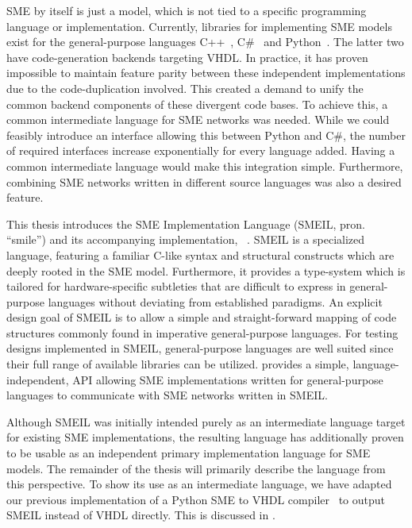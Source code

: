 SME by itself is just a model, which is not tied to a specific programming
language or implementation. Currently, libraries for implementing SME models
exist for the general-purpose languages C++~\cite{asheim2015},
C\#~\cite{skovhede2016building} and Python~\cite{asheim2016vhdl}. The latter two
have code-generation backends targeting VHDL. In practice, it has proven
impossible to maintain feature parity between these independent implementations
due to the code-duplication involved. This created a demand to unify the common
backend components of these divergent code bases. To achieve this, a common
intermediate language for SME networks was needed. While we could feasibly
introduce an interface allowing this between Python and C\#, the number of
required interfaces increase exponentially for every language added. Having a
common intermediate language would make this integration simple. Furthermore,
combining SME networks written in different source languages was also a desired
feature.

This thesis introduces the SME Implementation Language (SMEIL, pron. ``smile'')
and its accompanying implementation, \libsme{}~\cite{libsme}.
SMEIL is a specialized language, featuring a familiar C-like syntax and
structural constructs which are deeply rooted in the SME model. Furthermore, it
provides a type-system which is tailored for hardware-specific subtleties that
are difficult to express in general-purpose languages without deviating from
established paradigms. An explicit design goal of SMEIL is to allow a simple and
straight-forward mapping of code structures commonly found in imperative
general-purpose languages.  For testing designs implemented in SMEIL,
general-purpose languages are well suited since their full range of available
libraries can be utilized. \libsme{} provides a simple, language-independent,
API allowing SME implementations written for general-purpose languages to
communicate with SME networks written in SMEIL.

Although SMEIL was initially intended purely as an intermediate language target
for existing SME implementations, the resulting language has additionally proven
to be usable as an independent primary implementation language for SME
models. The remainder of the thesis will primarily describe the language from
this perspective. To show its use as an intermediate language, we have adapted
our previous implementation of a Python SME to VHDL compiler~\cite{almique} to
output SMEIL instead of VHDL directly. This is discussed in .


